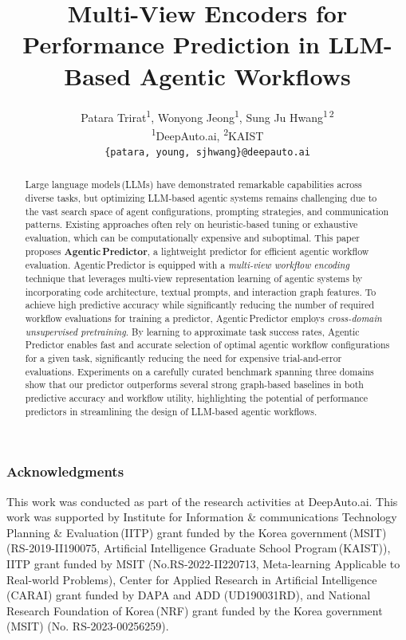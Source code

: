 \documentclass{article} %
\title{Multi-View Encoders for Performance Prediction in LLM-Based Agentic Workflows}
\author{Patara Trirat\textsuperscript{1}, Wonyong Jeong\textsuperscript{1}, Sung Ju Hwang\textsuperscript{1\,2} \\
\textsuperscript{1}DeepAuto.ai, \textsuperscript{2}KAIST \\
\texttt{\{patara, young, sjhwang\}@deepauto.ai}
}
\newcommand{\ours}{Agentic\,Predictor}
\begin{document}
\maketitle

\begin{abstract}
Large language models\,(LLMs) have demonstrated remarkable capabilities across diverse tasks, but optimizing LLM-based agentic systems remains challenging due to the vast search space of agent configurations, prompting strategies, and communication patterns. Existing approaches often rely on heuristic-based tuning or exhaustive evaluation, which can be computationally expensive and suboptimal. This paper proposes \textbf{\ours{}}, a lightweight predictor for efficient agentic workflow evaluation. \ours{} is equipped with a \emph{multi-view workflow encoding} technique that leverages multi-view representation learning of agentic systems by incorporating code architecture, textual prompts, and interaction graph features. To achieve high predictive accuracy while significantly reducing the number of required workflow evaluations for training a predictor, \ours{} employs \emph{cross-domain unsupervised pretraining}. By learning to approximate task success rates, \ours{} enables fast and accurate selection of optimal agentic workflow configurations for a given task, significantly reducing the need for expensive trial-and-error evaluations. Experiments on a carefully curated benchmark spanning three domains show that our predictor outperforms several strong graph-based baselines in both predictive accuracy and workflow utility, highlighting the potential of performance predictors in streamlining the design of LLM-based agentic workflows.
\end{abstract}











\subsubsection*{Acknowledgments}
This work was conducted as part of the research activities at DeepAuto.ai. This work was supported by Institute for Information \& communications Technology Planning \& Evaluation\,(IITP) grant funded by the Korea government\,(MSIT) (RS-2019-II190075, Artificial Intelligence Graduate School Program\,(KAIST)), IITP grant funded by MSIT (No.RS-2022-II220713, Meta-learning Applicable to Real-world Problems), Center for Applied Research in Artificial Intelligence\,(CARAI) grant funded by DAPA and ADD (UD190031RD), and National Research Foundation of Korea\,(NRF) grant funded by the Korea government\,(MSIT) (No. RS-2023-00256259).
\end{document}
